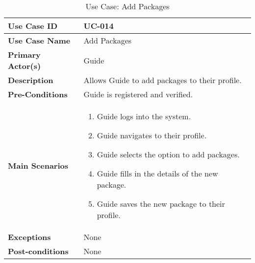 \begin{table}[ht]
    \centering
    \begin{tabular}{|l|p{}|}
        \hline
        \textbf{Use Case ID} & UC-014 \\
        \hline
        \textbf{Use Case Name} & Add Packages \\
        \hline
        \textbf{Primary Actor(s)} & Guide \\
        \hline
        \textbf{Description} & Allows Guide to add packages to their profile. \\
        \hline
        \textbf{Pre-Conditions} & Guide is registered and verified. \\
        \hline
        \textbf{Main Scenarios} & 
        \begin{enumerate}[label=\arabic*.,itemsep=0pt]
            \item Guide logs into the system.
            \item Guide navigates to their profile.
            \item Guide selects the option to add packages.
            \item Guide fills in the details of the new package.
            \item Guide saves the new package to their profile.
        \end{enumerate} \\
        \hline
        \textbf{Exceptions} & None \\
        \hline
        \textbf{Post-conditions} & None \\
        \hline
    \end{tabular}
    \label{tab:use-case-add-packages}
    \caption{Use Case: Add Packages}
\end{table}


